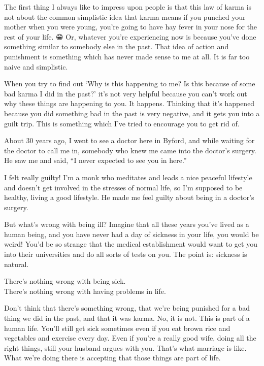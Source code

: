 \documentclass[12pt, openany]{book}
\newenvironment{aphorism}%
{%
\begin{center}\begin{itshape}
}%
{\end{itshape}\end{center}
}%
\begin{document}
The first thing I always like to impress upon people is that this law of karma is not about the common simplistic idea that karma means if you punched your mother when you were young, you’re going to have hay fever in your nose for the rest of your life. 😁 Or, whatever you’re experiencing now is because you’ve done something similar to somebody else in the past. That idea of action and punishment is something which has never made sense to me at all. It is far too naive and simplistic. 

When you try to find out ‘Why is this happening to me? Is this because of some bad karma I did in the past?’ it’s not very helpful because you can’t work out why these things are happening to you. It happens. Thinking that it’s happened because you did something bad in the past is very negative, and it gets you into a guilt trip. This is something which I’ve tried to encourage you to get rid of. 

About 30 years ago, I went to see a doctor here in Byford, and while waiting for the doctor to call me in, somebody who knew me came into the doctor’s surgery. He saw me and said, “I never expected to see you in here.” 

I felt really guilty! I’m a monk who meditates and leads a nice peaceful lifestyle and doesn’t get involved in the stresses of normal life, so I’m supposed to be healthy, living a good lifestyle. He made me feel guilty about being in a doctor’s surgery. 

But what’s wrong with being ill? Imagine that all these years you’ve lived as a human being, and you have never had a day of sickness in your life, you would be weird! You’d be so strange that the medical establishment would want to get you into their universities and do all sorts of tests on you. The point is: sickness is natural. 

\begin{aphorism}
There’s nothing wrong with being sick.\\  
There’s nothing wrong with having problems in life.
\end{aphorism}

Don’t think that there’s something wrong, that we’re being punished for a bad thing we did in the past, and that it was karma. No, it is not. This is part of a human life. You’ll still get sick sometimes even if you eat brown rice and vegetables and exercise every day. Even if you’re a really good wife, doing all the right things, still your husband argues with you. That’s what marriage is like. What we’re doing there is accepting that those things are part of life. 
\end{document}
